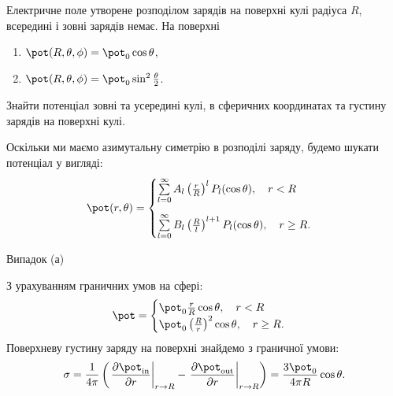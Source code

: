 \begin{problem}
Електричне поле утворене розподілом зарядів на поверхні кулі радіуса $R$, всередині і зовні зарядів немає. На поверхні
\begin{enumerate}[label=\alph*)]
	\item $\pot(R, \theta, \phi) = \pot_0\cos\theta$,
	\item $\pot(R, \theta, \phi) = \pot_0\sin^2\frac\theta2$.
\end{enumerate}
Знайти потенціал зовні та усередині кулі, в сферичних координатах та густину зарядів на поверхні кулі.
\begin{solution}
	Оскільки ми маємо азимутальну симетрію в розподілі заряду, будемо шукати потенціал у вигляді:
	\begin{equation}
		\pot(r, \theta) = \begin{cases}
			\sum\limits_{l=0}^{\infty}A_l \left( \frac{r}{R}\right)^l P_l(\cos\theta), \quad r<R \\[1.5em]
			\sum\limits_{l=0}^{\infty}B_l \left( \frac{R}{l}\right)^{l+1} P_l(\cos\theta), \quad r \ge R.
		\end{cases}
	\end{equation}

	Випадок (а)

	З урахуванням граничних умов на сфері:
	\begin{equation}
		\pot = \begin{cases}
			\pot_0\frac{r}{R} \cos\theta, \quad r<R \\
			\pot_0\left( \frac{R}{r}\right)^2 \cos\theta, \quad r \ge R.
		\end{cases}
	\end{equation}
	Поверхневу густину заряду на поверхні знайдемо з граничної умови:
	\begin{equation}
		\sigma = \frac{1}{4\pi} \left( \left. \frac{\partial \pot_{\mathrm{in}}}{\partial r}\right|_{r \to R} - \left. \frac{\partial \pot_{\mathrm{out}}}{\partial r}\right|_{r \to R} \right) =  \frac{3\pot_0}{4\pi R} \cos\theta.
	\end{equation}
\end{solution}
\end{problem}

